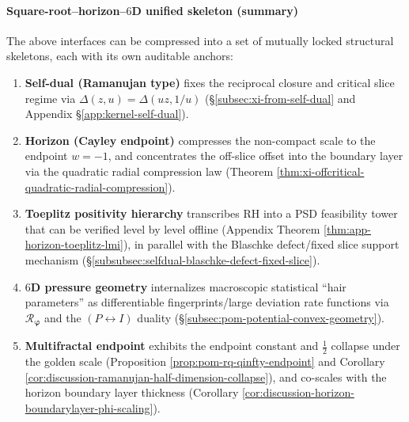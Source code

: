 \paragraph{Square-root--horizon--\(6\)D unified skeleton (summary)}
The above interfaces can be compressed into a set of mutually locked structural skeletons, each with its own auditable anchors:
\begin{enumerate}
  \item \textbf{Self-dual (Ramanujan type)} fixes the reciprocal closure and critical slice regime via \(\Delta(z,u)=\Delta(uz,1/u)\) (\S\ref{subsec:xi-from-self-dual} and Appendix \S\ref{app:kernel-self-dual}).
  \item \textbf{Horizon (Cayley endpoint)} compresses the non-compact scale to the endpoint \(w=-1\), and concentrates the off-slice offset into the boundary layer via the quadratic radial compression law (Theorem \ref{thm:xi-offcritical-quadratic-radial-compression}).
  \item \textbf{Toeplitz positivity hierarchy} transcribes RH into a PSD feasibility tower that can be verified level by level offline (Appendix Theorem \ref{thm:app-horizon-toeplitz-lmi}), in parallel with the Blaschke defect/fixed slice support mechanism (\S\ref{subsubsec:selfdual-blaschke-defect-fixed-slice}).
  \item \textbf{\(6\)D pressure geometry} internalizes macroscopic statistical ``hair parameters'' as differentiable fingerprints/large deviation rate functions via \(\mathcal{R}_{\boldsymbol{\varphi}}\) and the \((P\leftrightarrow I)\) duality (\S\ref{subsec:pom-potential-convex-geometry}).
  \item \textbf{Multifractal endpoint} exhibits the endpoint constant and \(\tfrac12\) collapse under the golden scale (Proposition \ref{prop:pom-rq-qinfty-endpoint} and Corollary \ref{cor:discussion-ramanujan-half-dimension-collapse}), and co-scales with the horizon boundary layer thickness (Corollary \ref{cor:discussion-horizon-boundarylayer-phi-scaling}).
\end{enumerate}

